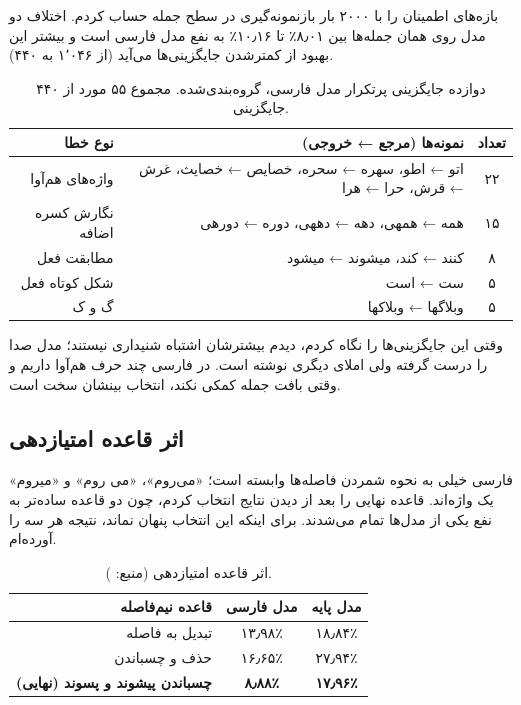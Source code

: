 \documentclass[11pt,a4paper]{article}
\newcommand{\en}[1]{\lr{#1}}
\newcommand{\code}[1]{\lr{\texttt{#1}}}
\begin{document}
بازه‌های اطمینان را با ۲۰۰۰ بار بازنمونه‌گیری در سطح جمله حساب کردم. اختلاف \en{WER} دو مدل روی همان جمله‌ها بین ۸٫۰۱٪ تا ۱۰٫۱۶٪ به نفع مدل فارسی است و بیشتر این بهبود از کمترشدن جایگزینی‌ها می‌آید (از ۱٬۰۴۶ به ۴۴۰).

\begin{table}[H]
\centering\small
\begin{tabular}{r r c}
\toprule
\textbf{نوع خطا} & \textbf{نمونه‌ها (مرجع ← خروجی)} & \textbf{تعداد} \\
\midrule
واژه‌های هم‌آوا & اتو ← اطو، سهره ← سحره، خصایص ← خصایث، غرش ← قرش، حرا ← هرا & ۲۲ \\
نگارش کسره اضافه & همه ← همهی، دهه ← دههی، دوره ← دورهی & ۱۵ \\
مطابقت فعل & کنند ← کند، میشوند ← میشود & ۸ \\
شکل کوتاه فعل & ست ← است & ۵ \\
گ و ک & وبلاگها ← وبلاکها & ۵ \\
\bottomrule
\end{tabular}
\caption{دوازده جایگزینی پرتکرار مدل فارسی، گروه‌بندی‌شده. مجموع ۵۵ مورد از ۴۴۰ جایگزینی.}
\end{table}

وقتی این جایگزینی‌ها را نگاه کردم، دیدم بیشترشان اشتباه شنیداری نیستند؛ مدل صدا را درست گرفته ولی املای دیگری نوشته است. در فارسی چند حرف هم‌آوا داریم و وقتی بافت جمله کمکی نکند، انتخاب بینشان سخت است.

\subsection{اثر قاعده امتیازدهی}

\en{WER} فارسی خیلی به نحوه شمردن فاصله‌ها وابسته است؛ «می‌روم»، «می روم» و «میروم» یک واژه‌اند. قاعده نهایی را بعد از دیدن نتایج انتخاب کردم، چون دو قاعده ساده‌تر به نفع یکی از مدل‌ها تمام می‌شدند. برای اینکه این انتخاب پنهان نماند، نتیجه هر سه را آورده‌ام.

\begin{table}[H]
\centering\small
\begin{tabular}{r c c}
\toprule
\textbf{قاعده نیم‌فاصله} & \textbf{\en{WER} مدل فارسی} & \textbf{\en{WER} مدل پایه} \\
\midrule
تبدیل به فاصله & ۱۳٫۹۸٪ & ۱۸٫۸۴٪ \\
حذف و چسباندن & ۱۶٫۶۵٪ & ۲۷٫۹۴٪ \\
\textbf{چسباندن پیشوند و پسوند (نهایی)} & \textbf{۸٫۸۸٪} & \textbf{۱۷٫۹۶٪} \\
\bottomrule
\end{tabular}
\caption{اثر قاعده امتیازدهی (منبع: \code{results/rescore.txt}).}
\end{table}
\end{document}
